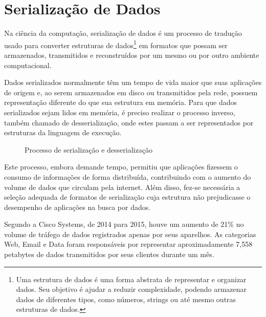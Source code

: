 \section[Serialização de Dados]{Serialização de Dados}

Na ciência da computação, serialização de dados é um processo de tradução usado para converter estruturas de dados\footnote{
  Uma estrutura de dados é uma forma abstrata de representar e organizar dados. Seu objetivo é ajudar a reduzir complexidade, podendo armazenar dados de diferentes tipos, como números, strings ou até mesmo outras estruturas de dados.
} em formatos que possam ser armazenados, transmitidos e reconstruídos por um mesmo ou por outro ambiente computacional. \cite{Cline2016}

Dados serializados normalmente têm um tempo de vida maior que suas aplicações de origem e, ao serem armazenados em disco ou transmitidos pela rede, possuem representação diferente do que sua estrutura em memória. Para que dados serializados sejam lidos em memória, é preciso realizar o processo inverso, também chamado de desserialização, onde estes passam a ser representados por estruturas da linguagem de execução. \cite{Guller2016}

\begin{figure}[H]
  \centering
  \caption{Processo de serialização e desserialização}
\end{figure}

Este processo, embora demande tempo, permitiu que aplicações fizessem o consumo de informações de forma distribuída, contribuindo com o aumento do volume de dados que circulam pela internet. Além disso, fez-se necessária a seleção adequada de formatos de serialização cuja estrutura não prejudicasse o desempenho de aplicações na busca por dados. \cite{SumarayMakki2012}

Segundo a Cisco Systems, de 2014 para 2015, houve um aumento de 21\% no volume de tráfego de dados registrados apenas por seus aparelhos. As categorias Web, Email e Data foram responsáveis por representar aproximadamente 7,558 petabytes de dados transmitidos por seus clientes durante um mês. \cite{Cisco2016}

